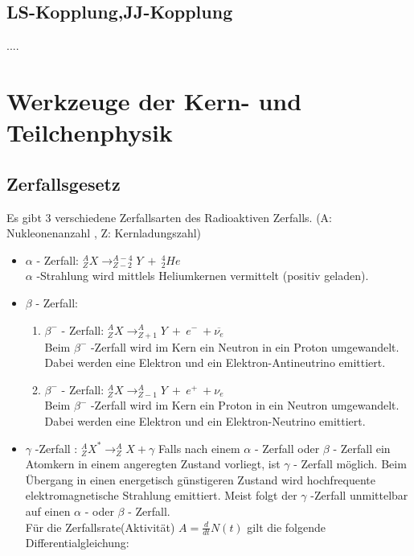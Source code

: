 \documentclass[Ex4_Zusammenfassung.tex]{subfiles}
\begin{document}
\section{LS-Kopplung,JJ-Kopplung}
....


\chapter{Werkzeuge der Kern- und Teilchenphysik} 

\section{Zerfallsgesetz}
Es gibt 3 verschiedene Zerfallsarten des Radioaktiven Zerfalls.  (A: Nukleonenanzahl , Z: Kernladungszahl)
\begin{itemize}
\item  $ \alpha $  - Zerfall:  $ ^{A}_{Z}X \rightarrow ^{A-4}_{Z-2}Y \ + \ ^{4}_{2}He $  \quad   \\ $ \alpha $ -Strahlung wird mittlels Heliumkernen vermittelt (positiv geladen). 
\item $ \beta $ - Zerfall: 
	\begin{enumerate} 
	\item $ \beta^{-} $ - Zerfall: $ ^{A}_{Z} X\rightarrow ^{A}_{Z+1} Y\ + \ e^{-} \ +\overline{\nu_{e}} $  \\ Beim  $ \beta^{-} $ -Zerfall wird im Kern ein Neutron in ein Proton umgewandelt. Dabei werden eine Elektron und ein Elektron-Antineutrino emittiert.
	\item $ \beta^{-} $ - Zerfall: $ ^{A}_{Z}X \rightarrow ^{A}_{Z-1}Y \ + \ e^{+} \ +\nu_{e} $ \\ Beim $ \beta^{-} $ -Zerfall wird im Kern ein Proton in ein Neutron umgewandelt. Dabei werden eine Elektron und ein Elektron-Neutrino emittiert.
	\end{enumerate}
\item $ \gamma $ -Zerfall :  $ ^{A}_{Z}X^{*} \rightarrow ^{A}_{Z}X + \gamma $ \newline Falls nach einem $ \alpha $ - Zerfall oder $ \beta $ - Zerfall ein Atomkern in einem angeregten Zustand vorliegt, ist $ \gamma $ - Zerfall möglich. Beim Übergang in einen energetisch günstigeren Zustand wird hochfrequente elektromagnetische Strahlung emittiert. Meist folgt der  $ \gamma $ -Zerfall unmittelbar auf einen $ \alpha $ - oder $ \beta $ - Zerfall. \\ 
\newline 
Für die Zerfallsrate(Aktivität) $ A = \frac{d}{dt} N(t)$  gilt die folgende Differentialgleichung: 

\end{itemize}
\end{document}
